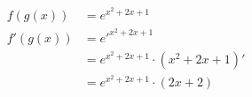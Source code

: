 \documentclass[preview]{standalone}
\begin{document}
\begin{align*}
f(g(x))&=e^{x^2+2x+1}\\ f'(g(x))&=e'^{x^2+2x+1}\\ &=e^{x^2+2x+1} \cdot (x^2+2x+1)'\\ &=e^{x^2+2x+1} \cdot (2x+2)
\end{align*}
\end{document}
